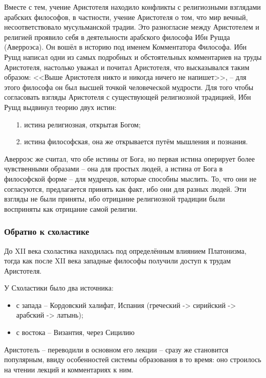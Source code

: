 \documentclass[a4paper, 12pt]{book} %
\begin{document}
Вместе с тем, учение Аристотеля находило конфликты с религиозными взглядами арабских философов, в частности, учение Аристотеля о том, что мир вечный, несоответствовало мусульманской традии. Это разногласие между Аристотелем и религией проявило себя в деятельности арабского философа Ибн Рушда (Аверроэса). Он вошёл в историю под именем Комментатора Философа. Ибн Рушд написал одни из самых подробных и обстоятельных комментариев на труды Аристотеля, настолько уважал и почитал Аристотеля, что высказывался таким образом: <<Выше Аристотеля никто и никогда ничего не напишет>>, -- для этого философа он был высшей точкой человеческой мудрости. Для того чтобы согласовать взгляды Аристотеля с существующей религиозной традицией, Ибн Рушд выдвинул теорию двух истин:
\begin{itemize}
\item[1.] истина религиозная, открытая Богом;
\item[2.] истина философская, она же открывается путём мышления и познания.
\end{itemize}
Аверроэс же считал, что обе истины от Бога, но первая истина оперирует более чувственными образами -- она для простых людей, а истина от Бога в философской форме -- для мудрецов, которые способны мыслить. То, что они не согласуются, предлагается принять как факт, ибо они для разных людей. Эти взгляды не были приняты, ибо отрицание религиозной традиции были восприняты как отрицание самой религии.

\newpage

\subsubsection{Обратно к схоластике}

До XII века схоластика находилась под определённым влиянием Платонизма, тогда как после XII века западные философы получили доступ к трудам Аристотеля.

У Схоластики было два источника:
\begin{itemize}
\item с запада -- Кордовский халифат, Испания (греческий -> сирийский -> арабский -> латынь);
\item с востока -- Византия, через Сицилию
\end{itemize}

Аристотель -- переводили в основном его лекции -- сразу же становится популярным, ввиду особенностей системы образования в то время: оно строилось на чтении лекций и комментариях к ним.
\end{document}
